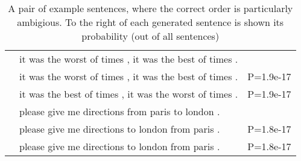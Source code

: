 \documentclass[class=article]{standalone}
\begin{document}
	
	
	
	
	\begin{table*}
		\small
		\begin{tabular}{ p{\collenone} p{\collentwo} p{\collenthree} }
			
			\textbf{}  & it was the worst of times , it was the best of times . &  \\
			\textbf{\oracletitle}  & it was the worst of times , it was the best of times . & P=1.9e-17 \\
			\textbf{\twosteptitle}  & it was the best of times , it was the worst of times . & P=1.9e-17 \\
			\hline
			\textbf{}  & please give me directions from paris to london . &  \\
			\textbf{\oracletitle}  & please give me directions to london from paris . & P=1.8e-17 \\
			\textbf{\twosteptitle}  & please give me directions to london from paris . & P=1.8e-17 \\
			\hline
		\end{tabular}
		\caption{    \label{egordered} A pair of example sentences, where the correct order is particularly ambigious.    To the right of each generated sentence is shown its probability (out of all sentences)}
	\end{table*}
	
	
	
	
	
	
\end{document}
